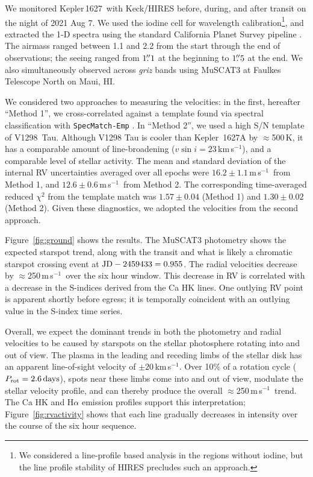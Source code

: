 \documentclass[12pt,modern,twocolumn,tighten]{aastex63}
\newcommand{\sn}{Kepler\,1627} %
\newcommand{\kms}{\,km\,s$^{-1}$}
\newcommand{\ms}{\,m\,s$^{-1}$}
\begin{document}
We monitored \sn\ with Keck/HIRES before, during, and after transit on
the night of 2021 Aug 7.  We used the iodine cell for wavelength
calibration\footnote{We considered a line-profile based analysis in
the regions without iodine, but the line profile stability of HIRES
precludes such an approach.}, and extracted the 1-D spectra using the
standard California Planet Survey pipeline \citep{howard_cps_2010}.
The airmass ranged between 1.1 and 2.2 from the start through the end
of observations; the seeing ranged from $1\mbox{$.\!\!^{\prime\prime}$}1$ at the beginning to
$1\mbox{$.\!\!^{\prime\prime}$}5$ at the end.  We also simultaneously observed across {\it
griz} bands using MuSCAT3 at Faulkes Telescope North on Maui, HI.

We considered two approaches to measuring the velocities: in the
first, hereafter ``Method 1'', we cross-correlated against a template
found via spectral classification with \texttt{SpecMatch-Emp}
\citep{yee_SM_2017}.  In ``Method 2'', we used a high S/N template of
V1298~Tau.  Although V1298 Tau is cooler than Kepler~1627A by
$\approx$500\,K, it has a comparable amount of line-broadening ($v\sin
i = 23$\kms), and a comparable level of stellar activity.  The mean
and standard deviation of the internal RV uncertainties averaged over
all epochs were $16.2\pm1.1$\ms\ from Method 1, and $12.6\pm0.6$\ms\
from Method 2.  The corresponding time-averaged reduced $\chi^2$ from
the template match was $1.57\pm0.04$ (Method 1) and $1.30\pm0.02$
(Method 2).  Given these diagnostics, we adopted the velocities from
the second approach.

Figure~\ref{fig:ground} shows the results.  The MuSCAT3 photometry
shows the expected starspot trend, along with the transit and what is
likely a chromatic starspot crossing event at ${\rm JD} - 2459433 =
0.955$.  The radial velocities decrease by $\approx$250\ms\ over the
six hour window.  This decrease in RV is correlated with a decrease in
the S-indices derived from the Ca HK lines.  One outlying RV point is
apparent shortly before egress; it is temporally coincident with an
outlying value in the S-index time series.

Overall, we expect the dominant trends in both the photometry and
radial velocities to be caused by starspots on the stellar photosphere
rotating into and out of view.  The plasma in the leading and receding
limbs of the stellar disk has an apparent line-of-sight velocity of
$\pm 20$\kms.  Over 10\% of a rotation cycle ($P_{\rm rot}=2.6\,{\rm
days}$), spots near these limbs come into and out of view, modulate
the stellar velocity profile, and can thereby produce the overall
$\approx$250\ms\ trend.  The Ca HK and H$\alpha$ emission profiles
support this interpretation; Figure~\ref{fig:rvactivity} shows that
each line gradually decreases in intensity over the course of the six
hour sequence.
\end{document}
